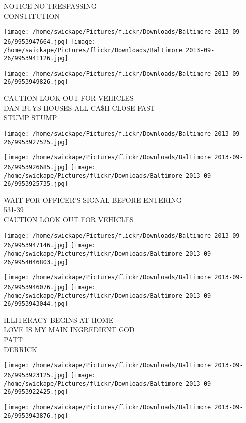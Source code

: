 \documentclass[10pt,letterpaper]{article}
\begin{document}
NOTICE NO TRESPASSING\\
CONSTITUTION
\pagebreak

\texttt{[image: /home/swickape/Pictures/flickr/Downloads/Baltimore 2013-09-26/9953947664.jpg]}
\texttt{[image: /home/swickape/Pictures/flickr/Downloads/Baltimore 2013-09-26/9953941126.jpg]}

\texttt{[image: /home/swickape/Pictures/flickr/Downloads/Baltimore 2013-09-26/9953949826.jpg]}

CAUTION LOOK OUT FOR VEHICLES\\
DAN BUYS HOUSES ALL CA\$H CLOSE FAST\\
STUMP STUMP
\pagebreak

\texttt{[image: /home/swickape/Pictures/flickr/Downloads/Baltimore 2013-09-26/9953927525.jpg]}

\vspace{0.25in}
\texttt{[image: /home/swickape/Pictures/flickr/Downloads/Baltimore 2013-09-26/9953926685.jpg]}
\texttt{[image: /home/swickape/Pictures/flickr/Downloads/Baltimore 2013-09-26/9953925735.jpg]}

WAIT FOR OFFICER'S SIGNAL BEFORE ENTERING\\
531{-}39\\
CAUTION LOOK OUT FOR VEHICLES
\pagebreak

\texttt{[image: /home/swickape/Pictures/flickr/Downloads/Baltimore 2013-09-26/9953947146.jpg]}
\texttt{[image: /home/swickape/Pictures/flickr/Downloads/Baltimore 2013-09-26/9954046803.jpg]}

\texttt{[image: /home/swickape/Pictures/flickr/Downloads/Baltimore 2013-09-26/9953946076.jpg]}
\texttt{[image: /home/swickape/Pictures/flickr/Downloads/Baltimore 2013-09-26/9953943044.jpg]}

ILLITERACY BEGINS AT HOME\\
LOVE IS MY MAIN INGREDIENT GOD\\
PATT\\
DERRICK
\pagebreak

\texttt{[image: /home/swickape/Pictures/flickr/Downloads/Baltimore 2013-09-26/9953923125.jpg]}
\texttt{[image: /home/swickape/Pictures/flickr/Downloads/Baltimore 2013-09-26/9953922425.jpg]}

\texttt{[image: /home/swickape/Pictures/flickr/Downloads/Baltimore 2013-09-26/9953943876.jpg]}
\end{document}
